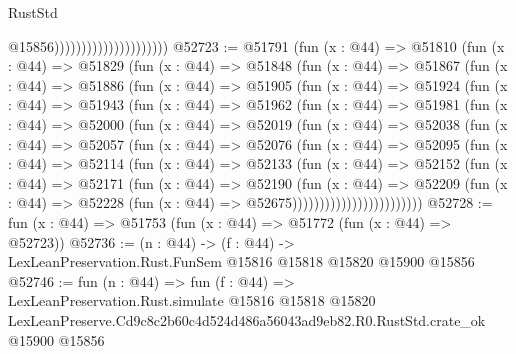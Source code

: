 \begin{lexlean}{RustStd}
\begin{coremodule}
                                              @15856)))))))))))))))))))))
@52723 := @51791
    (fun (x : @44) =>
    @51810
      (fun (x : @44) =>
      @51829
        (fun (x : @44) =>
        @51848
          (fun (x : @44) =>
          @51867
            (fun (x : @44) =>
            @51886
              (fun (x : @44) =>
              @51905
                (fun (x : @44) =>
                @51924
                  (fun (x : @44) =>
                  @51943
                    (fun (x : @44) =>
                    @51962
                      (fun (x : @44) =>
                      @51981
                        (fun (x : @44) =>
                        @52000
                          (fun (x : @44) =>
                          @52019
                            (fun (x : @44) =>
                            @52038
                              (fun (x : @44) =>
                              @52057
                                (fun (x : @44) =>
                                @52076
                                  (fun (x : @44) =>
                                  @52095
                                    (fun (x : @44) =>
                                    @52114
                                      (fun (x : @44) =>
                                      @52133
                                        (fun (x : @44) =>
                                        @52152
                                          (fun (x : @44) =>
                                          @52171
                                            (fun (x : @44) =>
                                            @52190
                                              (fun (x : @44) =>
                                              @52209
                                                (fun (x : @44) =>
                                                @52228
                                                  (fun (x : @44) => @52675))))))))))))))))))))))))
@52728 := fun (x : @44) => @51753 (fun (x : @44) => @51772 (fun (x : @44) => @52723))
@52736 := (n : @44) ->
  (f : @44) -> LexLeanPreservation.Rust.FunSem @15816 @15818 @15820 @15900 @15856
@52746 := fun (n : @44) =>
  fun (f : @44) =>
  LexLeanPreservation.Rust.simulate
    @15816
    @15818
    @15820
    LexLeanPreserve.Cd9c8c2b60c4d524d486a56043ad9eb82.R0.RustStd.crate_ok
    @15900
    @15856
\end{coremodule}
\end{lexlean}
